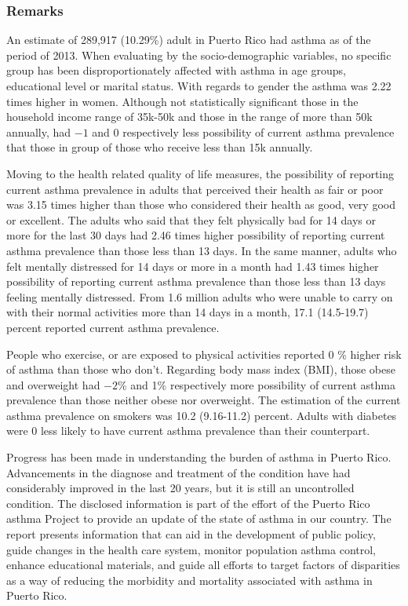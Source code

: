  \subsubsection{Remarks}

An estimate of 289,917 
(10.29\%) adult in Puerto Rico had asthma as of the period of 2013.
When evaluating by the socio-demographic variables, no specific group has been disproportionately affected with asthma in age groups, educational level or marital status. With regards to gender the asthma was 2.22 times higher in women. Although not statistically significant those in the household income range of 35k-50k and those in the range of more than 50k annually, had \ensuremath{-1} and 0 respectively less possibility of current asthma prevalence that those  in group of those who receive less than 15k annually.

Moving to the health related quality of life measures, the possibility of reporting current asthma prevalence in adults that perceived their health as fair or poor was 3.15 times higher than those who considered their health as good, very good or excellent. The adults who said that they felt physically bad for 14 days or more for the last 30 days had 2.46 times higher possibility of reporting current asthma prevalence than those less than 13 days. In the same manner, adults who felt mentally distressed for 14 days or more in a month had 1.43 times higher possibility of reporting current asthma prevalence than those less than 13 days feeling mentally distressed. From 1.6 million adults who were unable to carry on with their normal activities more than 14 days in a month, 17.1 (14.5-19.7) percent reported current asthma prevalence. 

People who exercise, or are exposed to physical activities reported 0 \% higher risk of asthma than those who don't.  Regarding body mass index (BMI), those obese and overweight had \ensuremath{-2}\% and 1\% respectively more possibility of current asthma prevalence than those neither obese nor overweight. The estimation of the current asthma prevalence on smokers was 10.2 (9.16-11.2) percent.  Adults with diabetes were 0\5 less likely to have current asthma prevalence than their counterpart.



Progress has been made in understanding the burden of asthma in Puerto Rico. Advancements in the diagnose and treatment of the condition have had considerably improved in the last 20 years, but it is still an uncontrolled condition. The disclosed information is part of the effort of the Puerto Rico asthma Project to provide an update of the state of asthma in our country. The report presents information that can aid in the development of public policy, guide changes in the health care system, monitor population asthma control, enhance educational materials, and guide all efforts to target factors of disparities as a way of reducing the morbidity and mortality associated with asthma in Puerto Rico.

